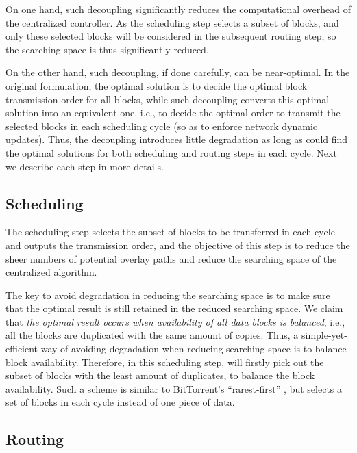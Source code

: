 On one hand, such decoupling significantly reduces the computational overhead of the centralized controller. As the scheduling step selects a subset of blocks, and only these selected blocks will be considered in the subsequent routing step, so the searching space is thus significantly reduced.

On the other hand, such decoupling, if done carefully, can be near-optimal. In the original formulation, the optimal solution is to decide the optimal block transmission order for all blocks, while such decoupling converts this optimal solution into an equivalent one, i.e., to decide the optimal order to transmit the selected blocks in each scheduling cycle (so as to enforce network dynamic updates). Thus, the decoupling introduces little degradation as long as \name could find the optimal solutions for both scheduling and routing steps in each cycle. Next we describe each step in more details.


\subsection{Scheduling}
\label{subsec:logic:scheduling}

The scheduling step
selects the subset of blocks to be transferred in each cycle and
outputs the transmission order, and the objective of this step is to reduce the sheer numbers of potential overlay paths and reduce the searching space of the centralized algorithm.


The key to avoid degradation in reducing the searching space is to make sure that the optimal result is still retained in the reduced searching space. We claim that {\em the optimal result occurs when availability of all data blocks is balanced}, i.e., all the blocks are duplicated with the same amount of copies. Thus, a simple-yet-efficient way of avoiding degradation when reducing searching space is to balance block availability. Therefore, in this scheduling step, \name will firstly pick out the subset of blocks with the least amount of duplicates, to balance the block availability. Such a scheme is similar to BitTorrent's ``rarest-first'' \cite{Cohen2003Incentives}, but \name selects a set of blocks in each cycle instead of one piece of data.


\subsection{Routing}
\label{subsec:logic:routing}

